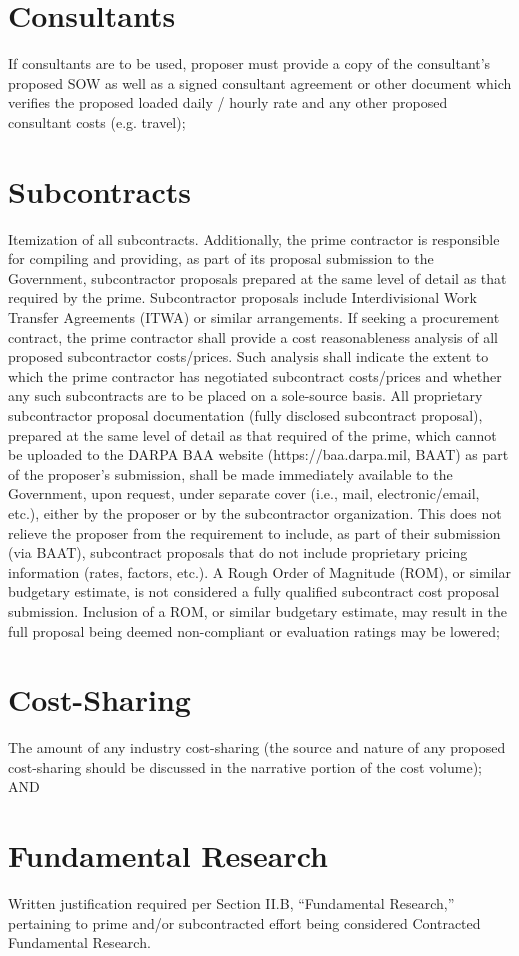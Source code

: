 \section{Consultants}
If consultants are to be used, proposer must provide a copy of the consultant’s proposed
SOW as well as a signed consultant agreement or other document which verifies the
proposed loaded daily / hourly rate and any other proposed consultant costs (e.g. travel);
\section{Subcontracts}
Itemization of all subcontracts. Additionally, the prime contractor is responsible for
compiling and providing, as part of its proposal submission to the Government, subcontractor
proposals prepared at the same level of detail as that required by the prime. Subcontractor
proposals include Interdivisional Work Transfer Agreements (ITWA) or similar
arrangements. If seeking a procurement contract, the prime contractor shall provide a cost
reasonableness analysis of all proposed subcontractor costs/prices. Such analysis shall
indicate the extent to which the prime contractor has negotiated subcontract costs/prices and
whether any such subcontracts are to be placed on a sole-source basis.
All proprietary subcontractor proposal documentation (fully disclosed subcontract proposal),
prepared at the same level of detail as that required of the prime, which cannot be uploaded
to the DARPA BAA website (https://baa.darpa.mil, BAAT) as part of the proposer’s
submission, shall be made immediately available to the Government, upon request, under
separate cover (i.e., mail, electronic/email, etc.), either by the proposer or by the
subcontractor organization. This does not relieve the proposer from the requirement to
include, as part of their submission (via BAAT), subcontract proposals that do not include
proprietary pricing information (rates, factors, etc.).
A Rough Order of Magnitude (ROM), or similar budgetary estimate, is not considered a fully
qualified subcontract cost proposal submission. Inclusion of a ROM, or similar budgetary
estimate, may result in the full proposal being deemed non-compliant or evaluation ratings
may be lowered;
\section{Cost-Sharing}
The amount of any industry cost-sharing (the source and nature of any proposed cost-sharing
should be discussed in the narrative portion of the cost volume); AND
\section{Fundamental Research}
Written justification required per Section II.B, “Fundamental Research,” pertaining to prime
and/or subcontracted effort being considered Contracted Fundamental Research.


